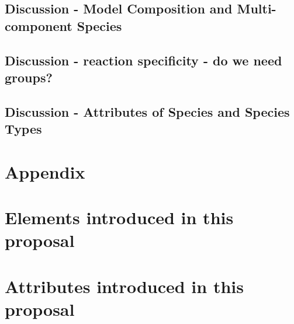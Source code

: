 \documentclass{cekarticle}
\begin{document}
\subsection{Discussion - Model Composition and Multi-component Species}

\subsection{Discussion - reaction specificity - do we need groups?}

\subsection{Discussion - Attributes of Species and Species Types}

\newpage
\section{Appendix}
\setcounter{secnumdepth}{2}
\appendix

\section{Elements introduced in this proposal}
\section{Attributes introduced in this proposal}



\end{document}
